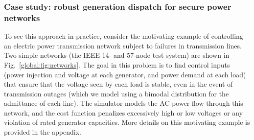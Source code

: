 


\subsubsection{Case study: robust generation dispatch for secure power networks}

To see this approach in practice, consider the motivating example of controlling an electric power transmission network subject to failures in transmission lines. Two simple networks (the IEEE 14- and 57-node test system) are shown in Fig.~\ref{global:fig:networks}. The goal in this problem is to find control inputs (power injection and voltage at each generator, and power demand at each load) that ensure that the voltage seen by each load is stable, even in the event of transmission outages (which we model using a bimodal distribution for the admittance of each line). The simulator models the AC power flow through this network, and the cost function penalizes excessively high or low voltages or any violation of rated generator capacities. More details on this motivating example is provided in the appendix.

